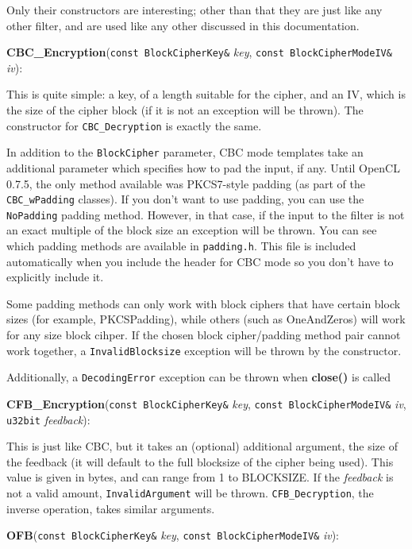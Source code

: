 \documentclass{article}
\newcommand{\filename}[1]{\texttt{#1}}
\newcommand{\function}[1]{\textbf{#1}}
\newcommand{\type}[1]{\texttt{#1}}
\renewcommand{\arg}[1]{\textsl{#1}}
\begin{document}
Only their constructors are interesting; other than that they are just like any
other filter, and are used like any other discussed in this documentation.

\vskip 10pt \noindent
\function{CBC\_Encryption}(\type{const BlockCipherKey\&} \arg{key},
                           \type{const BlockCipherModeIV\&} \arg{iv}):

\vskip 5pt
This is quite simple: a key, of a length suitable for the cipher, and an IV,
which is the size of the cipher block (if it is not an exception will be
thrown). The constructor for \type{CBC\_Decryption} is exactly the
same.

In addition to the \type{BlockCipher} parameter, CBC mode templates take an
additional parameter which specifies how to pad the input, if any. Until OpenCL
0.7.5, the only method available was PKCS7-style padding (as part of the
\type{CBC\_wPadding} classes). If you don't want to use padding, you can use
the \type{NoPadding} padding method. However, in that case, if the input to the
filter is not an exact multiple of the block size an exception will be
thrown. You can see which padding methods are available in
\filename{padding.h}. This file is included automatically when you include the
header for CBC mode so you don't have to explicitly include it.

Some padding methods can only work with block ciphers that have certain block
sizes (for example, PKCSPadding), while others (such as OneAndZeros) will work
for any size block cihper. If the chosen block cipher/padding method pair
cannot work together, a \type{InvalidBlocksize} exception will be thrown by the
constructor.

Additionally, a \type{DecodingError} exception can be thrown when
\function{close()} is called 

\vskip 10pt \noindent
\function{CFB\_Encryption}(\type{const BlockCipherKey\&} \arg{key},
                           \type{const BlockCipherModeIV\&} \arg{iv},
                           \type{u32bit} \arg{feedback}):

\vskip 5pt
This is just like CBC, but it takes an (optional) additional argument, the size
of the feedback (it will default to the full blocksize of the cipher being
used). This value is given in bytes, and can range from 1 to BLOCKSIZE. If the
\arg{feedback} is not a valid amount, \type{InvalidArgument} will be
thrown. \type{CFB\_Decryption}, the inverse operation, takes similar arguments.

\vskip 10pt \noindent
\function{OFB}(\type{const BlockCipherKey\&} \arg{key},
               \type{const BlockCipherModeIV\&} \arg{iv}):
\end{document}
